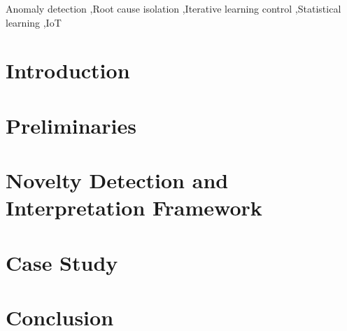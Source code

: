 \documentclass[preprint,12pt,authoryear]{elsarticle}
\begin{document}
\begin{frontmatter}
\begin{keyword}
Anomaly detection \sep Root cause isolation \sep Iterative learning control \sep Statistical learning \sep IoT
\end{keyword}

\end{frontmatter}


\section{Introduction}
\label{Introduction}


\section{Preliminaries}
\label{Preliminaries}


\section{Novelty Detection and Interpretation Framework}
\label{Proposed Method}


\section{Case Study}
\label{Case Study}


\section{Conclusion}
\label{Conclusion}












\end{document}
